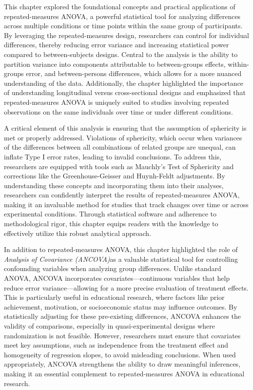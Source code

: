 \documentclass[
  letterpaper,
  DIV=11,
  numbers=noendperiod]{scrreprt}
\begin{document}

This chapter explored the foundational concepts and practical
applications of repeated-measures ANOVA, a powerful statistical tool for
analyzing differences across multiple conditions or time points within
the same group of participants. By leveraging the repeated-measures
design, researchers can control for individual differences, thereby
reducing error variance and increasing statistical power compared to
between-subjects designs. Central to the analysis is the ability to
partition variance into components attributable to between-groups
effects, within-groups error, and between-persons differences, which
allows for a more nuanced understanding of the data. Additionally, the
chapter highlighted the importance of understanding longitudinal versus
cross-sectional designs and emphasized that repeated-measures ANOVA is
uniquely suited to studies involving repeated observations on the same
individuals over time or under different conditions.

A critical element of this analysis is ensuring that the assumption of
sphericity is met or properly addressed. Violations of sphericity, which
occur when variances of the differences between all combinations of
related groups are unequal, can inflate Type I error rates, leading to
invalid conclusions. To address this, researchers are equipped with
tools such as Mauchly's Test of Sphericity and corrections like the
Greenhouse-Geisser and Huynh-Feldt adjustments. By understanding these
concepts and incorporating them into their analyses, researchers can
confidently interpret the results of repeated-measures ANOVA, making it
an invaluable method for studies that track changes over time or across
experimental conditions. Through statistical software and adherence to
methodological rigor, this chapter equips readers with the knowledge to
effectively utilize this robust analytical approach.

In addition to repeated-measures ANOVA, this chapter highlighted the
role of \emph{Analysis of Covariance (ANCOVA)}as a valuable statistical
tool for controlling confounding variables when analyzing group
differences. Unlike standard ANOVA, ANCOVA incorporates
covariates---continuous variables that help reduce error
variance---allowing for a more precise evaluation of treatment effects.
This is particularly useful in educational research, where factors like
prior achievement, motivation, or socioeconomic status may influence
outcomes. By statistically adjusting for these pre-existing differences,
ANCOVA enhances the validity of comparisons, especially in
quasi-experimental designs where randomization is not feasible. However,
researchers must ensure that covariates meet key assumptions, such as
independence from the treatment effect and homogeneity of regression
slopes, to avoid misleading conclusions. When used appropriately, ANCOVA
strengthens the ability to draw meaningful inferences, making it an
essential complement to repeated-measures ANOVA in educational research.
\end{document}
